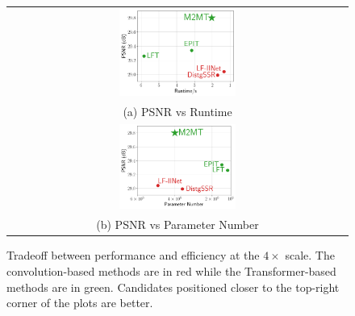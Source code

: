 \begin{figure}[ht]
    \centering
    \tabcolsep=0.01cm
    \renewcommand{\arraystretch}{0.8}
    \begin{tabular}{c}
        \includegraphics[width=0.35\textwidth]{img/tradeoff/runtime.pdf} \\
        (a) PSNR vs Runtime \\
        \includegraphics[width=0.35\textwidth]{img/tradeoff/parameter.pdf} \\
        (b) PSNR vs Parameter Number
    \end{tabular}
    \caption{Tradeoff between performance and efficiency at the $4\times$ scale. The convolution-based methods are in red while the Transformer-based methods are in green. Candidates positioned closer to the top-right corner of the plots are better. }
    \label{fig:tradeoff}
\end{figure}